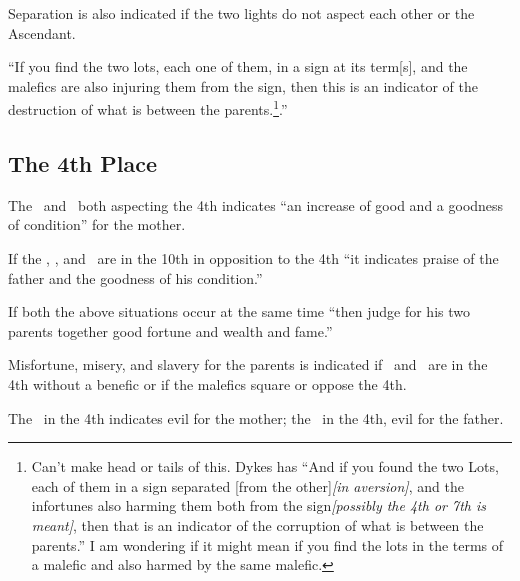 Separation is also indicated if the two lights do not aspect each other or the Ascendant.

``If you find the two lots, each one of them, in a sign at its term[s], and the malefics are also injuring them from the sign, then this is an indicator of the destruction of what is between the parents.\footnote{Can't make head or tails of this. Dykes has ``And if you found the two Lots, each of them in a sign separated [from the other]\textsl{[in aversion]}, and the infortunes also harming them both from the sign\textsl{[possibly the 4th or 7th is meant]}, then that is an indicator of the corruption of what is between the parents.'' I am wondering if it might mean if you find the lots in the terms of a malefic and also harmed by the same malefic.}.''

\subsection{The 4th Place}
The \Moon\, and \Venus\, both aspecting the 4th indicates ``an increase of good and a goodness of condition'' for the mother.

If the \Sun, \Jupiter, and \Saturn\, are in the 10th in opposition to the 4th ``it indicates praise of the father and the goodness of his condition.'' 

If both the above situations occur at the same time ``then judge for his two parents together good fortune and wealth and fame.''

Misfortune, misery, and slavery for the parents is indicated if \Mars\, and \Saturn\, are in the 4th without a benefic or if the malefics square or oppose the 4th.

The \Moon\, in the 4th indicates evil for the mother; the \Sun\, in the 4th, evil for the father.



